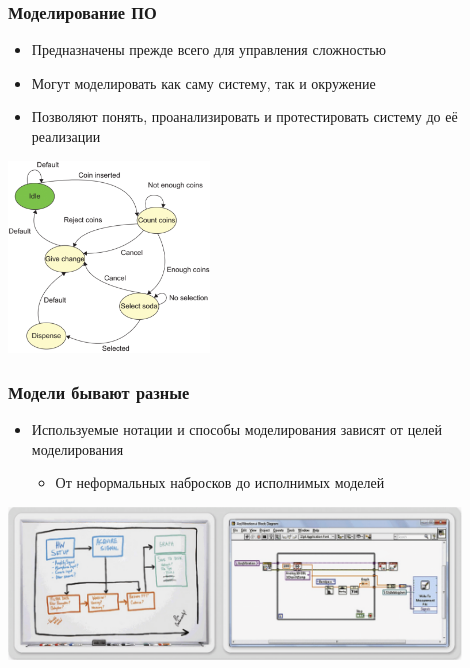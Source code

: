 \documentclass{../mcsslides}
\begin{document}
    \begin{frame}
        \frametitle{Моделирование ПО}
        \begin{itemize}
            \item Предназначены прежде всего для управления сложностью
            \item Могут моделировать как саму систему, так и окружение
            \item Позволяют понять, проанализировать и протестировать систему до её реализации
        \end{itemize}
        \begin{center}
            \includegraphics[width=0.4\textwidth]{vendingMachine.png}
        \end{center}
    \end{frame}

    \begin{frame}
        \frametitle{Модели бывают разные}
        \begin{itemize}
            \item Используемые нотации и способы моделирования зависят от целей моделирования
            \begin{itemize}
                \item От неформальных набросков до исполнимых моделей
            \end{itemize}
        \end{itemize}
        \begin{center}
            \includegraphics[width=0.9\textwidth]{sketchesVsFormalNotations.png}
        \end{center}
    \end{frame}
\end{document}
